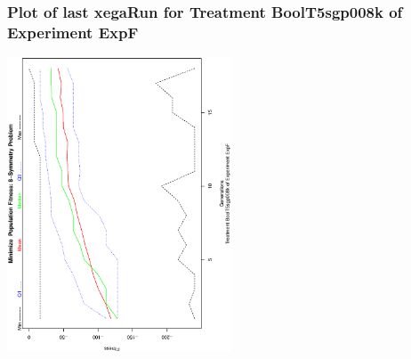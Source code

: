  \begin{frame}
 \frametitle{ Plot of last xegaRun for Treatment BoolT5sgp008k of Experiment ExpF }
 \begin{center}
\includegraphics[width=0.5\textwidth, angle=-90]
{ExpFPlotPopStatsFigure006.eps}
 \end{center}
 \label{templateReport/ExpFPlotPopStatsFigure006.eps}  
 \end{frame}

